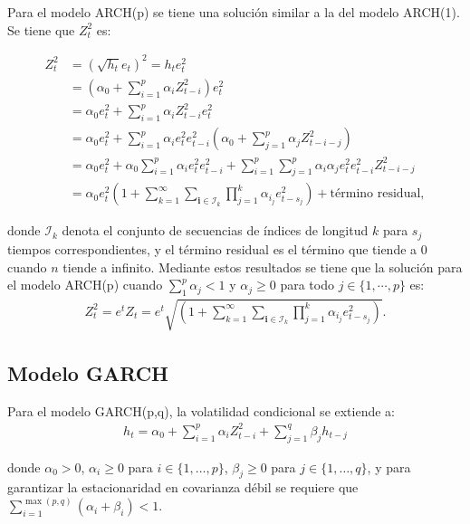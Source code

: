 Para el modelo ARCH(p) se tiene una solución similar a la del modelo ARCH(1). Se tiene que $Z_t^2$ es:

\begin{align*}
    Z_t^2 &= \left(\sqrt{h_t} e_t\right)^2 = h_t e_t^2\\
    &= \left(\alpha_0 + \sum_{i=1}^{p} \alpha_i Z_{t-i}^2\right) e_t^2\\
    &= \alpha_0 e_t^2 + \sum_{i=1}^{p} \alpha_i Z_{t-i}^2 e_t^2\\
    &= \alpha_0 e_t^2 + \sum_{i=1}^{p} \alpha_i e_t^2 e_{t-i}^2 \left(\alpha_0 + \sum_{j=1}^{p} \alpha_j Z_{t-i-j}^2\right)\\
    &= \alpha_0 e_t^2 + \alpha_0 \sum_{i=1}^{p} \alpha_i e_t^2 e_{t-i}^2 + \sum_{i=1}^{p} \sum_{j=1}^{p} \alpha_i \alpha_j e_t^2 e_{t-i}^2 Z_{t-i-j}^2\\
    &= \alpha_0 e_t^2 \left(1 + \sum_{k=1}^{\infty} \sum_{\mathbf{i} \in \mathcal{I}_k} \prod_{j=1}^{k} \alpha_{i_j} e_{t-s_j}^2\right) + \text{término residual},
\end{align*}

donde $\mathcal{I}_k$ denota el conjunto de secuencias de índices de longitud $k$ para $s_j$ tiempos correspondientes, y el término residual es el término que tiende a 0 cuando $n$ tiende a infinito. Mediante estos resultados se tiene que la solución para el modelo ARCH(p) cuando $\sum_{1}^p\alpha_j<1 $ y $\alpha_j\geq 0 $ para todo $j\in \{1,\cdots,p\}$ es: 
\begin{align*}
    Z_t^2= e^{t}Z_t=e^t\sqrt{\left(1 + \sum_{k=1}^{\infty} \sum_{\mathbf{i} \in \mathcal{I}_k} \prod_{j=1}^{k} \alpha_{i_j} e_{t-s_j}^2\right)}.
\end{align*}
\newline



\subsection{Modelo GARCH}

Para el modelo GARCH(p,q), la volatilidad condicional se extiende a:
\begin{align*}
    h_t = \alpha_0 + \sum_{i=1}^{p} \alpha_i Z_{t-i}^2 + \sum_{j=1}^{q} \beta_j h_{t-j}
\end{align*}

donde $\alpha_0 > 0$, $\alpha_i \geq 0$ para $i \in \{1, \ldots, p\}$, $\beta_j \geq 0$ para $j \in \{1, \ldots, q\}$, y para garantizar la estacionaridad en covarianza débil se requiere que $\sum_{i=1}^{\max(p,q)} (\alpha_i + \beta_i) < 1$.
\newline

